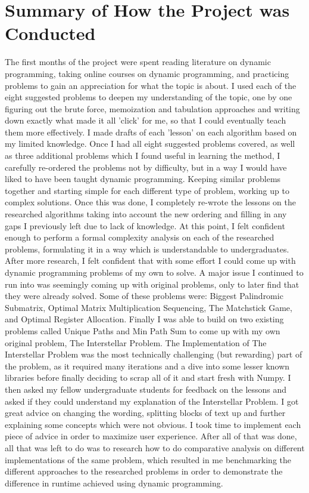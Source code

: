 \section{Summary of How the Project was Conducted}
The first months of the project were spent reading literature on dynamic programming, taking online courses on dynamic programming, and practicing problems to gain an appreciation for what the topic is about.
I used each of the eight suggested problems to deepen my understanding of the topic, one by one figuring out the brute force,
memoization and tabulation approaches and writing down exactly what made it all 'click' for me,
so that I could eventually teach them more effectively.
I made drafts of each 'lesson' on each algorithm based on my limited knowledge.
Once I had all eight suggested problems covered, as well as three additional problems which I found useful in learning the method,
I carefully re-ordered the problems not by difficulty, but in a way I would have liked to have been taught dynamic programming. Keeping similar problems together and starting simple for each different type of problem, working up to complex solutions.
Once this was done, I completely re-wrote the lessons on the researched algorithms taking into account the new ordering and filling in any gaps I previously left due to lack of knowledge.
At this point, I felt confident enough to perform a formal complexity analysis on each of the researched problems, formulating it in a way which is understandable to undergraduates.
After more research, I felt confident that with some effort I could come up with dynamic programming problems of my own to solve.
A major issue I continued to run into was seemingly coming up with original problems, only to later find that they were already solved.
Some of these problems were: Biggest Palindromic Submatrix, Optimal Matrix Multiplication Sequencing, The Matchstick Game, and Optimal Register Allocation.
Finally I was able to build on two existing problems called Unique Paths and Min Path Sum to come up with my own original problem, The Interstellar Problem.
The Implementation of The Interstellar Problem was the most technically challenging (but rewarding) part of the problem, as it required many iterations and a dive into some lesser known libraries before finally deciding to scrap all of it and start fresh with Numpy.
I then asked my fellow undergraduate students for feedback on the lessons and asked if they could understand my explanation of the Interstellar Problem.
I got great advice on changing the wording, splitting blocks of text up and further explaining some concepts which were not obvious. I took time to implement each piece of advice in order to maximize user experience.
After all of that was done, all that was left to do was to research how to do comparative analysis on different implementations of the same problem, which resulted in me benchmarking the different approaches to the researched problems in order to demonstrate the difference in runtime achieved using dynamic programming.